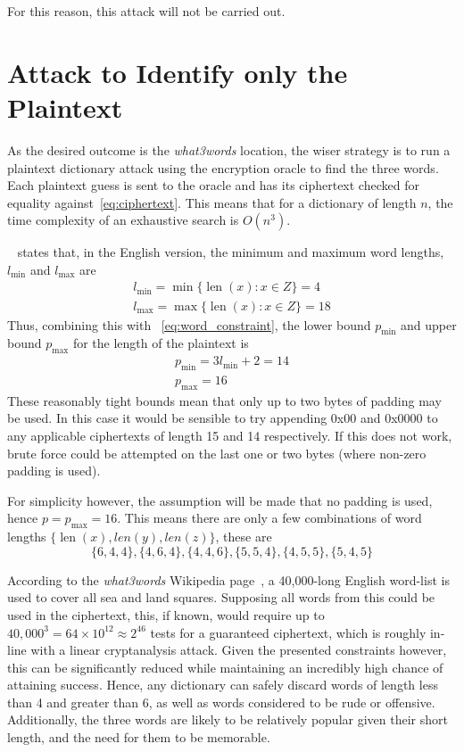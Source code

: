 \documentclass[11pt]{article}
\DeclareMathOperator{\len}{len}
\begin{document}
    For this reason, this attack will not be carried out.


    \section{Attack to Identify only the Plaintext}\label{sec:plaintext-identification-attack}
    As the desired outcome is the \textit{what3words} location, the wiser strategy is to run a plaintext dictionary attack using the encryption oracle to find the three words.
    Each plaintext guess is sent to the oracle and has its ciphertext checked for equality against~\eqref{eq:ciphertext}.
    This means that for a dictionary of length $n$, the time complexity of an exhaustive search is $O(n^3)$.

    ~\cite{what3words_support} states that, in the English version, the minimum and maximum word lengths, $l_{\min}$ and $l_{\max}$ are
    \begin{gather*}
        l_{\min} = \min\{ \len(x) : x \in Z \} = 4\\
        l_{\max} = \max\{ \len(x) : x \in Z \} = 18
    \end{gather*}
    Thus, combining this with ~\eqref{eq:word_constraint}, the lower bound $p_{\min}$ and upper bound $p_{\max}$ for the length of the plaintext is
    \begin{gather*}
        p_{\min} = 3l_{\min} + 2 = 14\\
        p_{\max} = 16
    \end{gather*}
    These reasonably tight bounds mean that only up to two bytes of padding may be used.
    In this case it would be sensible to try appending 0x00 and 0x0000 to any applicable ciphertexts of length 15 and 14 respectively.
    If this does not work, brute force could be attempted on the last one or two bytes (where non-zero padding is used).

    For simplicity however, the assumption will be made that no padding is used, hence $p = p_{\max} = 16$.
    This means there are only a few combinations of word lengths $\{\len(x), len(y), len(z)\}$, these are
    \[\{6, 4, 4\}, \{4, 6, 4\}, \{4, 4, 6\}, \{5, 5, 4\}, \{4, 5, 5\}, \{5, 4, 5\}\]

    According to the \textit{what3words} Wikipedia page~\cite{what3words_wikipedia}, a 40,000-long English word-list is used to cover all sea and land squares.
    Supposing all words from this could be used in the ciphertext, this, if known, would require up to $40,000^3 = 64\times10^{12} \approx 2^{46}$ tests for a guaranteed ciphertext, which is roughly in-line with a linear cryptanalysis attack.
    Given the presented constraints however, this can be significantly reduced while maintaining an incredibly high chance of attaining success.
    Hence, any dictionary can safely discard words of length less than 4 and greater than 6, as well as words considered to be rude or offensive.
    Additionally, the three words are likely to be relatively popular given their short length, and the need for them to be memorable.
\end{document}
